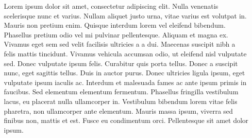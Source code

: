 Lorem ipsum dolor sit amet, consectetur adipiscing elit. Nulla
venenatis scelerisque nunc et varius. Nullam aliquet justo urna,
vitae varius est volutpat in. Mauris non pretium enim. Quisque
interdum lorem vel eleifend bibendum. Phasellus pretium odio vel mi
pulvinar pellentesque. Aliquam et magna ex. Vivamus eget sem sed
velit facilisis ultricies a a dui. Maecenas suscipit nibh a felis
mattis tincidunt. Vivamus vehicula accumsan odio, ut eleifend nisl
vulputate sed. Donec vulputate ipsum felis. Curabitur quis porta
tellus. Donec a suscipit nunc, eget sagittis tellus. Duis in auctor
purus. Donec ultricies ligula ipsum, eget vulputate ipsum iaculis
ac. Interdum et malesuada fames ac ante ipsum primis in faucibus.
Sed elementum elementum fermentum. Phasellus fringilla vestibulum
lacus, eu placerat nulla ullamcorper in. Vestibulum bibendum lorem
vitae felis pharetra, non ullamcorper ante elementum. Mauris massa
ipsum, viverra sed finibus non, mattis et est. Fusce eu condimentum
orci. Pellentesque sit amet dolor ipsum. 
